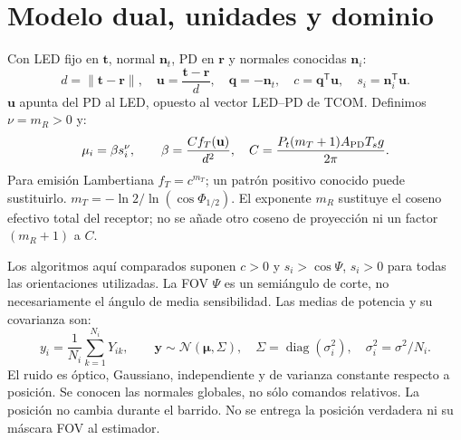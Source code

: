 \documentclass[11pt,a4paper]{article}
\begin{document}
\section{Modelo dual, unidades y dominio}
Con LED fijo en $\mathbf t$, normal $\mathbf n_t$, PD en $\mathbf r$ y normales conocidas $\mathbf n_i$:
\begin{equation}
 d=\|\mathbf t-\mathbf r\|,\quad \mathbf u=\frac{\mathbf t-\mathbf r}{d},\quad
 \mathbf q=-\mathbf n_t,\quad c=\mathbf q^{\mathsf T}\mathbf u,\quad s_i=\mathbf n_i^{\mathsf T}\mathbf u.
\end{equation}
$\mathbf u$ apunta del PD al LED, opuesto al vector LED--PD de TCOM. Definimos $\nu=m_R>0$ y:
\begin{equation}
 \mu_i=\beta s_i^\nu,\qquad \beta=\frac{Cf_T(\mathbf u)}{d^2},\quad
 C=\frac{P_t(m_T+1)A_{\rm PD}T_sg}{2\pi}.
\label{eq:dual}
\end{equation}
Para emisión Lambertiana $f_T=c^{m_T}$; un patrón positivo conocido puede sustituirlo. $m_T=-\ln2/\ln(\cos\Phi_{1/2})$. El exponente $m_R$ sustituye el coseno efectivo total del receptor; no se añade otro coseno de proyección ni un factor $(m_R+1)$ a $C$.

Los algoritmos aquí comparados suponen $c>0$ y $s_i>\cos\Psi$, $s_i>0$ para todas las orientaciones utilizadas. La FOV $\Psi$ es un semiángulo de corte, no necesariamente el ángulo de media sensibilidad. Las medias de potencia y su covarianza son:
\begin{equation}
 y_i=\frac1{N_i}\sum_{k=1}^{N_i}Y_{ik},\qquad
 \mathbf y\sim\mathcal N(\bm\mu,\Sigma),\quad
 \Sigma=\operatorname{diag}(\sigma_i^2),\quad \sigma_i^2=\sigma^2/N_i.
\end{equation}
El ruido es óptico, Gaussiano, independiente y de varianza constante respecto a posición. Se conocen las normales globales, no sólo comandos relativos. La posición no cambia durante el barrido. No se entrega la posición verdadera ni su máscara FOV al estimador.
\end{document}
